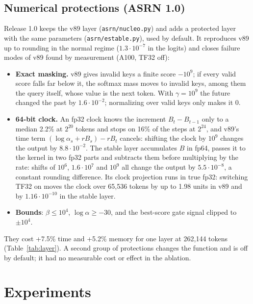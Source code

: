 \documentclass[11pt]{article}
\begin{document}
\subsection{Numerical protections (ASRN 1.0)}
\label{sec:protections}
Release 1.0 keeps the v89 layer (\nolinkurl{asrn/nucleo.py}) and adds a protected layer with the same parameters
(\nolinkurl{asrn/estable.py}), used by default. It reproduces v89 up to rounding in the normal regime
($1.3\cdot10^{-7}$ in the logits) and closes failure modes of v89 found by measurement (A100, TF32 off):
\begin{itemize}
\item \textbf{Exact masking.} v89 gives invalid keys a finite score $-10^9$; if every valid score falls far below it,
  the softmax mass moves to invalid keys, among them the query itself, whose value is the next token. With
  $\gamma=10^9$ the future changed the past by $1.6\cdot10^{-2}$; normalizing over valid keys only makes it 0.
\item \textbf{64-bit clock.} An fp32 clock knows the increment $B_t-B_{t-1}$ only to a median 2.2\% at $2^{20}$ tokens
  and stops on 16\% of the steps at $2^{24}$, and v89's time term $(\log\alpha_s+rB_s)-rB_t$ cancels: shifting the clock
  by $10^9$ changes the output by $8.8\cdot10^{-2}$. The stable layer accumulates $B$ in fp64, passes it to the kernel
  in two fp32 parts and subtracts them before multiplying by the rate: shifts of $10^6$, $1.6\cdot10^7$ and $10^9$ all
  change the output by $5.5\cdot10^{-8}$, a constant rounding difference. Its clock projection runs in true fp32:
  switching TF32 on moves the clock over 65{,}536 tokens by up to 1.98 units in v89 and by $1.16\cdot10^{-10}$ in the
  stable layer.
\item \textbf{Bounds}: $\beta\le10^4$, $\log\alpha\ge-30$, and the best-score gate signal clipped to $\pm10^4$.
\end{itemize}
They cost +7.5\% time and +5.2\% memory for one layer at 262{,}144 tokens (Table~\ref{tab:layer}). A second group of
protections changes the function and is off by default; it had no measurable cost or effect in the ablation.

\section{Experiments}
\label{sec:experiments}
\end{document}
